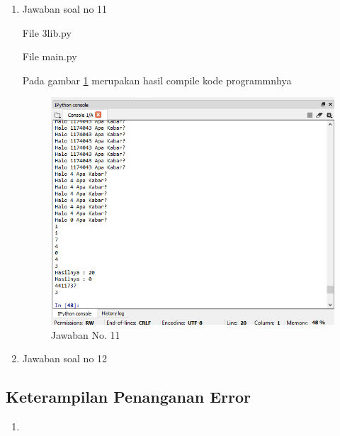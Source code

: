 \begin{enumerate}
				
			\item Jawaban soal no 11
			
				File 3lib.py
				
				
				File main.py
				
				
				\subitem Pada gambar \ref{gambar11} merupakan hasil compile kode programmnhya

				\begin{figure} [ht]
					\centerline{\includegraphics[width=1\textwidth]{figures/chapter3/11_1174043.png}}
					\caption{Jawaban No. 11}
					\label{gambar11}
				\end{figure}

		
				
			\item Jawaban soal no 12
			
		
			
		\end{enumerate}
		
		\subsection{Keterampilan Penanganan Error}
			\begin{enumerate}
				\item 
			
			\end{enumerate}
			
		
